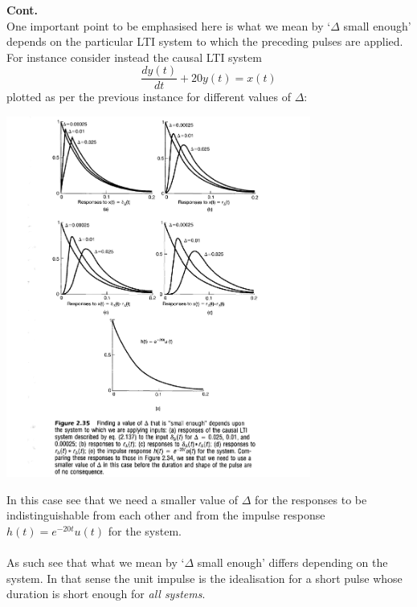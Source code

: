 \documentclass{report}
\begin{document}
\noindent\textbf{Cont.}\\
One important point to be emphasised here is what we mean by `$\Delta$ small enough' depends on the particular LTI system to which the preceding pulses are applied. For instance consider instead
the causal LTI system
\begin{equation*}
\frac{dy(t)}{dt}+20y(t)=x(t)
\end{equation*}
plotted as per the previous instance for different values of $\Delta$:
\begin{center}
\includegraphics[width=10cm]{a54}
\end{center}
In this case see that we need a smaller value of $\Delta$ for the responses to be indistinguishable from each other and from the impulse response $h(t)=e^{-20t}u(t)$ for the system.\\
\vspace{1mm}\\
As such see that what we mean by `$\Delta$ small enough' differs depending on the system. In that sense the unit impulse is the idealisation for a short pulse whose duration is short enough for \textit{all systems}.
\newpage
\end{document}
